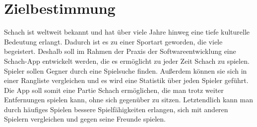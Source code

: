 \documentclass[parskip=full]{scrartcl}
\begin{document}
	\begin{titlepage}
		
		
	
	\newpage	
	\tableofcontents
	\pagebreak
	
	\end{titlepage}
\section{Zielbestimmung}

\gls{Schach} ist weltweit bekannt und hat über viele Jahre hinweg eine tiefe kulturelle Bedeutung erlangt. Dadurch ist es zu einer Sportart geworden, die viele begeistert.
Deshalb soll im Rahmen der Praxis der Softwareentwicklung eine \gls{Schach}-App entwickelt werden, die es ermöglicht zu jeder Zeit Schach zu spielen.
Spieler sollen Gegner durch eine Spielsuche finden. Außerdem können sie sich in einer Rangliste vergleichen und es wird eine Statistik über jeden Spieler geführt.
Die App soll somit eine Partie \gls{Schach} ermöglichen, die man trotz weiter Entfernungen spielen kann, ohne sich gegenüber zu sitzen.
Letztendlich kann man durch häufiges Spielen bessere Spielfähigkeiten erlangen, sich mit anderen Spielern vergleichen und gegen seine Freunde spielen.
\end{document}
